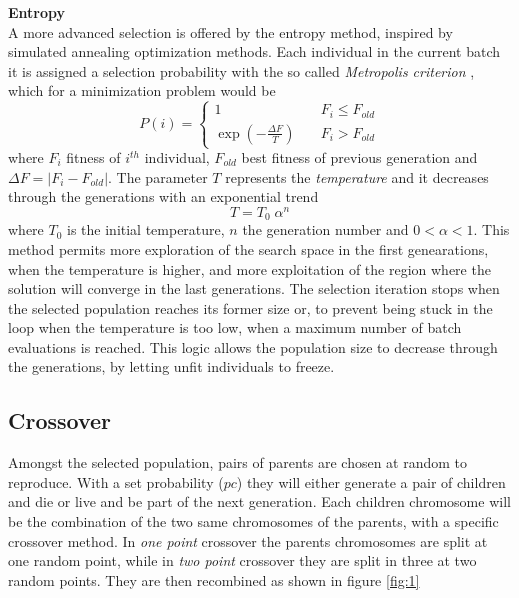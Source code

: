 \documentclass[twocolumn]{article}
\begin{document}
\textbf{Entropy}\\
A more advanced selection is offered by the entropy method, inspired by simulated annealing optimization methods. Each individual in the current batch it is assigned a selection probability with the so called \textit{Metropolis criterion} \cite{EvComputing}, which for a minimization problem would be 
\begin{equation}
  \label{eq:Metropolis}
  P(i) = \begin{cases}
    1 \quad& F_i \leq F_{old}\\
    \exp\left(- \frac{\Delta F}{T}\right) \quad & F_i > F_{old}
  \end{cases}
\end{equation}
where $F_i$ fitness of $i^{th}$ individual, $F_{old}$ best fitness of previous generation and $\Delta F = |F_i - F_{old}|$. The parameter $T$ represents the \textit{temperature} and it decreases through the generations with an exponential trend
\begin{equation}
  T = T_0\; \alpha ^ n
  \label{eq:Temperature}
\end{equation}
where $T_0$ is the initial temperature, $n$ the generation number and \(0 < \alpha < 1\).
This method permits more exploration of the search space in the first genearations, when the temperature is higher, and more exploitation of the region where the solution will converge in the last generations. The selection iteration stops when the selected population reaches its former size or, to prevent being stuck in the loop when the temperature is too low, when a maximum number of batch evaluations is reached. This logic allows the population size to decrease through the generations, by letting unfit individuals to freeze.

\subsection{Crossover}
Amongst the selected population, pairs of parents are chosen at random to reproduce. With a set probability ($pc$) they will either generate a pair of children and die or live and be part of the next generation. Each children chromosome will be the combination of the two same chromosomes of the parents, with a specific crossover method. In \textit{one point} crossover the parents chromosomes are split at one random point, while in \textit{two point} crossover they are split in three at two random points. They are then recombined as shown in figure \ref{fig:1}
\end{document}
